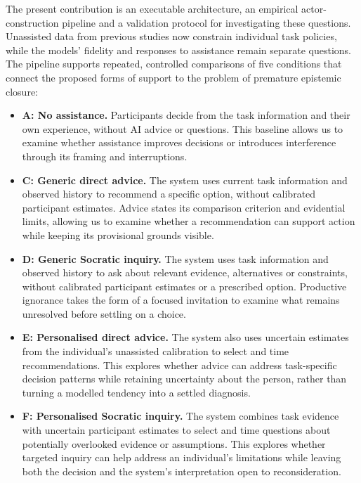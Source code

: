 \documentclass[11pt,a4paper]{article}
\begin{document}
The present contribution is an executable architecture, an empirical actor-construction pipeline and a validation protocol for investigating these questions. Unassisted data from previous studies now constrain individual task policies, while the models' fidelity and responses to assistance remain separate questions. The pipeline supports repeated, controlled comparisons of five conditions that connect the proposed forms of support to the problem of premature epistemic closure:
\begin{itemize}
  \item \textbf{A: No assistance.} Participants decide from the task information and their own experience, without AI advice or questions. This baseline allows us to examine whether assistance improves decisions or introduces interference through its framing and interruptions.
  \item \textbf{C: Generic direct advice.} The system uses current task information and observed history to recommend a specific option, without calibrated participant estimates. Advice states its comparison criterion and evidential limits, allowing us to examine whether a recommendation can support action while keeping its provisional grounds visible.
  \item \textbf{D: Generic Socratic inquiry.} The system uses task information and observed history to ask about relevant evidence, alternatives or constraints, without calibrated participant estimates or a prescribed option. Productive ignorance takes the form of a focused invitation to examine what remains unresolved before settling on a choice.
  \item \textbf{E: Personalised direct advice.} The system also uses uncertain estimates from the individual's unassisted calibration to select and time recommendations. This explores whether advice can address task-specific decision patterns while retaining uncertainty about the person, rather than turning a modelled tendency into a settled diagnosis.
  \item \textbf{F: Personalised Socratic inquiry.} The system combines task evidence with uncertain participant estimates to select and time questions about potentially overlooked evidence or assumptions. This explores whether targeted inquiry can help address an individual's limitations while leaving both the decision and the system's interpretation open to reconsideration.
\end{itemize}
\end{document}
